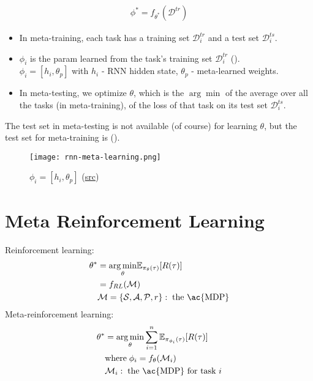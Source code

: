 \begin{align}
	\phi^* = f_{\theta^*} (\mathcal{D}^{tr})
\end{align}


\begin{itemize}
	\item In meta-training, each task has a training set $\mathcal{D}^{tr}_i$ and a test set $\mathcal{D}^{ts}_i$.
	\item $\phi_i$ is the \ac{param} learned from the task's training set $\mathcal{D}^{tr}_i$ ().\\
	$\phi_i = [h_i, \theta_p]$ with $h_i$ - \ac{RNN} hidden state, $\theta_p$ - meta-learned weights.
	\item In meta-testing, we optimize $\theta$, which is the $\arg\min$ of the average over all the tasks (in meta-training), of the loss of that task on its test set $\mathcal{D}^{ts}_i$.
\end{itemize}
\note The test set in meta-testing is not available (of course) for learning $\theta$, but the test set for meta-training is ().

\begin{figure}[hbt!]
	\centering
	\texttt{[image: rnn-meta-learning.png]}
	\caption{$\phi_i = [h_i, \theta_p]$ (\href{http://rail.eecs.berkeley.edu/deeprlcourse/static/slides/lec-22.pdf}{src})}
	\label{fig:rnn-meta-learning}
\end{figure}

\section{Meta Reinforcement Learning}
\begin{multicols}{2}
	Reinforcement learning:
	\begin{align*}
		\theta^* &= \underset{\theta}{\arg\min} \mathbb{E}_{\pi_\theta(\tau)} [R(\tau)]\\
		&= f_{RL}(\mathcal{M})\\
		&\mathcal{M} = \{\mathcal{S, A, P}, r\}:\;\text{the \ac{MDP}}
	\end{align*}
	Meta-reinforcement learning:
	\begin{align*}
		\theta^* &= \underset{\theta}{\arg\min} \sum_{i=1}^n \mathbb{E}_{\pi_{\phi_i}(\tau)} [R(\tau)]\\
		&\text{where}\; \phi_i = f_\theta(\mathcal{M}_i)\\
		&\mathcal{M}_i:\;\text{the \ac{MDP} for task $i$}
	\end{align*}
\end{multicols}

